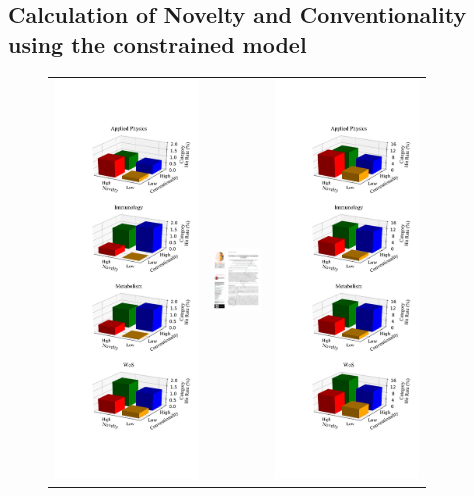 \documentclass[NETN]{stjour}
\begin{document}
\subsection{Calculation of Novelty and Conventionality using the constrained model}  
\begin{figure}
\centering
\begin{tabular}{ccc}
\includegraphics[width=1.5in]{Fig2H01N10.pdf} & \includegraphics[width=0.5in]{blank.pdf} & \includegraphics[width=1.5in]{Fig2H10N10.pdf} \\

\end{tabular}
\end{figure}
\end{document}
